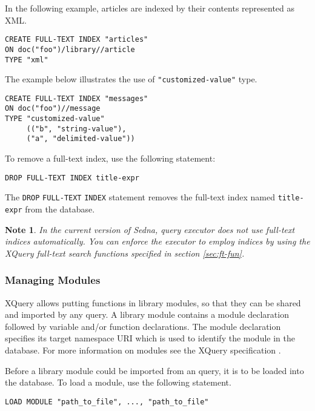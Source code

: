 \documentclass[a4paper,12pt]{article}
\newtheorem{note}{Note}    %
\begin{document}
In the following example, articles are indexed by their contents represented as
XML.

\begin{verbatim}
CREATE FULL-TEXT INDEX "articles"
ON doc("foo")/library//article
TYPE "xml"
\end{verbatim}

The example below illustrates the use of \verb!"customized-value"! type.
\begin{verbatim}
CREATE FULL-TEXT INDEX "messages"
ON doc("foo")//message
TYPE "customized-value"
     (("b", "string-value"),
     ("a", "delimited-value"))
\end{verbatim}

To remove a full-text index, use the following statement:
\begin{verbatim}
DROP FULL-TEXT INDEX title-expr
\end{verbatim}

The \verb!DROP! \verb!FULL-TEXT! \verb!INDEX! statement removes the full-text
index named \verb!title-expr! from the database.

\begin{note}
In the current version of Sedna, query executor does not use full-text indices
automatically. You can enforce the executor to employ indices by using the
XQuery full-text search functions specified in section \ref{sec:ft-fun}.
\end{note}


\subsubsection{Managing Modules}
XQuery allows putting functions in library modules, so that they can be shared
and imported by any query. A library module contains a module declaration
followed by variable and/or function declarations. The module declaration
specifies its target namespace URI which is used to identify the module in the
database. For more information on modules see the XQuery specification
\cite{paper:query-language}.

Before a library module could be imported from an query, it is to be loaded into
the database. To load a module, use the following statement.

\begin{verbatim}
LOAD MODULE "path_to_file", ..., "path_to_file"
\end{verbatim}
\end{document}
